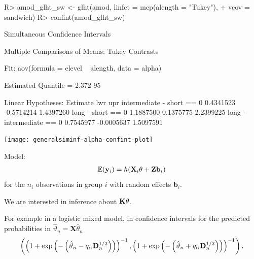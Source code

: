 \documentclass[landscape]{slides}
\begin{document}
\newpage

\begin{Schunk}
\begin{Sinput}
R> amod_glht_sw <- glht(amod, linfct = mcp(alength = "Tukey"),
+                       vcov = sandwich)
R> confint(amod_glht_sw)
\end{Sinput}
\begin{Soutput}
	 Simultaneous Confidence Intervals

Multiple Comparisons of Means: Tukey Contrasts


Fit: aov(formula = elevel ~ alength, data = alpha)

Estimated Quantile = 2.372
95%
 

Linear Hypotheses:
                          Estimate   lwr        upr       
intermediate - short == 0  0.4341523 -0.5714214  1.4397260
long - short == 0          1.1887500  0.1375775  2.2399225
long - intermediate == 0   0.7545977 -0.0005637  1.5097591
\end{Soutput}
\end{Schunk}

\newpage

\begin{center}
\texttt{[image: generalsiminf-alpha-confint-plot]}
\end{center}  


Model:
\begin{eqnarray*}
\mathbb{E}(\mathbf{y}_i) = h(\mathbf{X}_i \theta + \mathbf{Z} \mathbf{b}_i)
\end{eqnarray*}
for the $n_i$ observations in group $i$ with random effects $\mathbf{b}_i$.

We are interested in inference about $\mathbf{K} \theta$. 

For example in a logistic mixed model, in
confidence intervals for the predicted probabilities in $\hat{\vartheta}_n = \mathbf{X} \hat{\theta}_n$
\begin{eqnarray*}
\left(\left(1 + \exp\left(- \left(\hat{\vartheta}_n - q_\alpha \mathbf{D}_n^{1/2}\right)\right)\right)^{-1},
\left(1 + \exp\left(- \left(\hat{\vartheta}_n + q_\alpha \mathbf{D}_n^{1/2}\right)\right)\right)^{-1}\right).
\end{eqnarray*}

\end{document}
